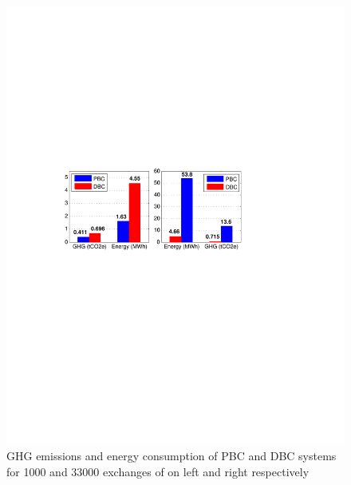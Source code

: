 \documentclass[conference]{IEEEtran}
\begin{document}
\begin{figure}[h]
\centering
\includegraphics[scale=0.7]{fs.pdf}
\caption{GHG emissions and energy consumption of PBC and DBC systems for 1000 and 33000 exchanges of on left and right respectively}
\label{fig:onescore}
\end{figure}

\end{document}
